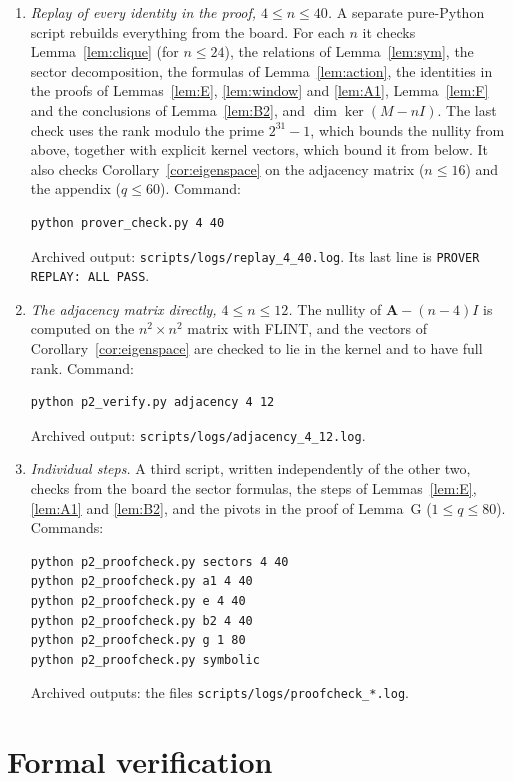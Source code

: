 \documentclass[11pt]{amsart}
\theoremstyle{plain}
\theoremstyle{definition}
\theoremstyle{remark}
\numberwithin{equation}{section}
\newcommand{\Adj}{\mathbf{A}}          %
\begin{document}
\begin{enumerate}
\item \emph{Replay of every identity in the proof, \(4\le n\le40\).} A separate
pure-Python script rebuilds everything from the board. For each \(n\) it checks
Lemma~\ref{lem:clique} (for \(n\le24\)), the relations of Lemma~\ref{lem:sym}, the
sector decomposition, the formulas of Lemma~\ref{lem:action}, the identities in the
proofs of Lemmas~\ref{lem:E}, \ref{lem:window} and \ref{lem:A1}, Lemma~\ref{lem:F} and
the conclusions of Lemma~\ref{lem:B2}, and \(\dim\ker(M-nI)\). The last check uses the
rank modulo the prime \(2^{31}-1\), which bounds the nullity from above, together with
explicit kernel vectors, which bound it from below. It also checks
Corollary~\ref{cor:eigenspace} on the adjacency matrix (\(n\le16\)) and the appendix
(\(q\le60\)). Command:
\begin{verbatim}
python prover_check.py 4 40
\end{verbatim}
Archived output: \nolinkurl{scripts/logs/replay_4_40.log}. Its last line is
\texttt{PROVER REPLAY: ALL PASS}.

\item \emph{The adjacency matrix directly, \(4\le n\le12\).} The nullity of
\(\Adj-(n-4)I\) is computed on the \(n^2\times n^2\) matrix with FLINT, and the vectors
of Corollary~\ref{cor:eigenspace} are checked to lie in the kernel and to have full
rank. Command:
\begin{verbatim}
python p2_verify.py adjacency 4 12
\end{verbatim}
Archived output: \nolinkurl{scripts/logs/adjacency_4_12.log}.

\item \emph{Individual steps.} A third script, written independently of the other two,
checks from the board the sector formulas, the steps of Lemmas~\ref{lem:E},
\ref{lem:A1} and \ref{lem:B2}, and the pivots in the proof of Lemma~G
(\(1\le q\le80\)). Commands:
\begin{verbatim}
python p2_proofcheck.py sectors 4 40
python p2_proofcheck.py a1 4 40
python p2_proofcheck.py e 4 40
python p2_proofcheck.py b2 4 40
python p2_proofcheck.py g 1 80
python p2_proofcheck.py symbolic
\end{verbatim}
Archived outputs: the files \nolinkurl{scripts/logs/proofcheck_*.log}.
\end{enumerate}

\section{Formal verification}\label{sec:formal}
\end{document}

